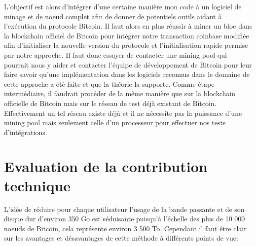 \documentclass[12pt,a4paper]{article}
\begin{document}
	L'objectif est alors d'intégrer d'une certaine manière mon code à un logiciel de minage et de noeud complet afin de donner de potentiels outils aidant à l'exécution du protocole Bitcoin. Il faut alors en plus réussir à miner un bloc dans la blockchain officiel de Bitcoin pour intégrer notre transaction coinbase modifiée afin d'initialiser la nouvelle version du protocole et l'initialisation rapide permise par notre approche. Il faut donc essayer de contacter une mining pool qui pourrait nous y aider et contacter l'équipe de développement de Bitcoin pour leur faire savoir qu'une implémentation dans les logiciels reconnus dans le domaine de cette approche a été faite et que la théorie la supporte. Comme étape intermédiaire, il faudrait procéder de la même manière que sur la blockchain officielle de Bitcoin mais sur le réseau de test déjà existant de Bitcoin. Effectivement un tel réseau existe déjà et il ne nécessite pas la puissance d'une mining pool mais seulement celle d'un processeur pour effectuer nos tests d'intégrations.\\
		
	\section{Evaluation de la contribution technique} %
	
	L'idée de réduire pour chaque utilisateur l'usage de la bande passante et de son disque dur d'environ 350 Go est séduisante puisqu'à l'échelle des plus de 10 000 noeuds de Bitcoin, cela représente environ 3 500 To. Cependant il faut être clair sur les avantages et désavantages de cette méthode à différents points de vue:
	
\end{document}
